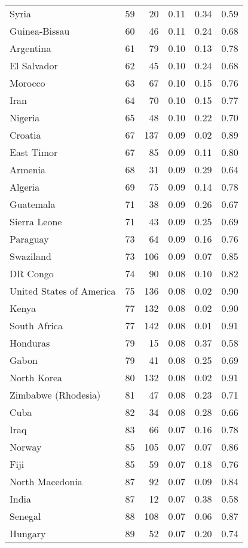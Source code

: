 \begin{longtable}[t]{lrrrrr}
Syria & 59 & 20 & 0.11 & 0.34 & 0.59\\
Guinea-Bissau & 60 & 46 & 0.11 & 0.24 & 0.68\\
\addlinespace
Argentina & 61 & 79 & 0.10 & 0.13 & 0.78\\
El Salvador & 62 & 45 & 0.10 & 0.24 & 0.68\\
Morocco & 63 & 67 & 0.10 & 0.15 & 0.76\\
Iran & 64 & 70 & 0.10 & 0.15 & 0.77\\
Nigeria & 65 & 48 & 0.10 & 0.22 & 0.70\\
\addlinespace
Croatia & 67 & 137 & 0.09 & 0.02 & 0.89\\
East Timor & 67 & 85 & 0.09 & 0.11 & 0.80\\
Armenia & 68 & 31 & 0.09 & 0.29 & 0.64\\
Algeria & 69 & 75 & 0.09 & 0.14 & 0.78\\
Guatemala & 71 & 38 & 0.09 & 0.26 & 0.67\\
\addlinespace
Sierra Leone & 71 & 43 & 0.09 & 0.25 & 0.69\\
Paraguay & 73 & 64 & 0.09 & 0.16 & 0.76\\
Swaziland & 73 & 106 & 0.09 & 0.07 & 0.85\\
DR Congo & 74 & 90 & 0.08 & 0.10 & 0.82\\
United States of America & 75 & 136 & 0.08 & 0.02 & 0.90\\
\addlinespace
Kenya & 77 & 132 & 0.08 & 0.02 & 0.90\\
South Africa & 77 & 142 & 0.08 & 0.01 & 0.91\\
Honduras & 79 & 15 & 0.08 & 0.37 & 0.58\\
Gabon & 79 & 41 & 0.08 & 0.25 & 0.69\\
North Korea & 80 & 132 & 0.08 & 0.02 & 0.91\\
\addlinespace
Zimbabwe (Rhodesia) & 81 & 47 & 0.08 & 0.23 & 0.71\\
Cuba & 82 & 34 & 0.08 & 0.28 & 0.66\\
Iraq & 83 & 66 & 0.07 & 0.16 & 0.78\\
Norway & 85 & 105 & 0.07 & 0.07 & 0.86\\
Fiji & 85 & 59 & 0.07 & 0.18 & 0.76\\
\addlinespace
North Macedonia & 87 & 92 & 0.07 & 0.09 & 0.84\\
India & 87 & 12 & 0.07 & 0.38 & 0.58\\
Senegal & 88 & 108 & 0.07 & 0.06 & 0.87\\
Hungary & 89 & 52 & 0.07 & 0.20 & 0.74\\

\end{longtable}
